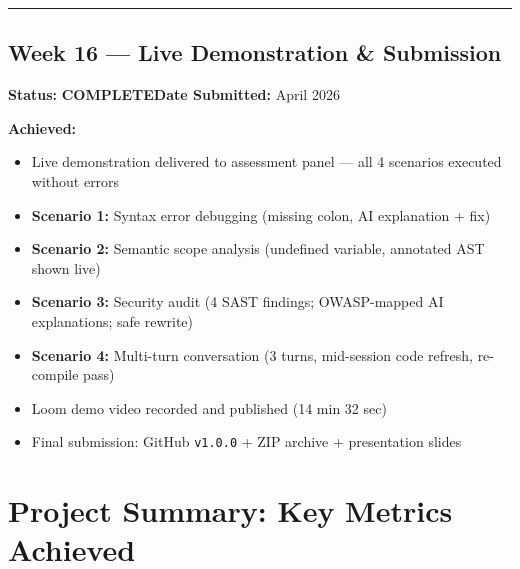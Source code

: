 \documentclass[a4paper,11pt]{article}
\newcommand{\done}{\colorbox{green!25}{\textbf{\small COMPLETE}}}
\begin{document}
\vspace{4pt}\hrule\vspace{6pt}

\subsection{Week 16 --- Live Demonstration \& Submission}

\textbf{Status:} \done \hfill \textbf{Date Submitted:} April 2026

\textbf{Achieved:}
\begin{itemize}[leftmargin=*, itemsep=1pt]
    \item Live demonstration delivered to assessment panel --- all 4 scenarios executed without errors
    \item \textbf{Scenario 1:} Syntax error debugging (missing colon, AI explanation + fix)
    \item \textbf{Scenario 2:} Semantic scope analysis (undefined variable, annotated AST shown live)
    \item \textbf{Scenario 3:} Security audit (4 SAST findings; OWASP-mapped AI explanations; safe rewrite)
    \item \textbf{Scenario 4:} Multi-turn conversation (3 turns, mid-session code refresh, re-compile pass)
    \item Loom demo video recorded and published (14 min 32 sec)
    \item Final submission: GitHub \texttt{v1.0.0} + ZIP archive + presentation slides
\end{itemize}

\newpage
\section*{Project Summary: Key Metrics Achieved}
\end{document}
